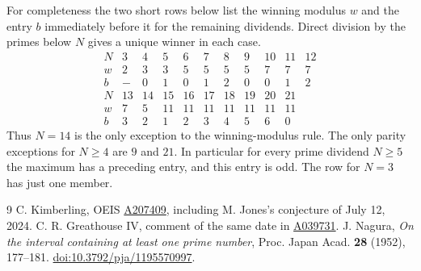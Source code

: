 \documentclass[11pt,letterpaper]{article}
\newcommand{\oeis}[1]{\href{https://oeis.org/A#1}{A#1}}
\begin{document}
For completeness the two short rows below list the winning modulus $w$ and the entry $b$ immediately before it for the remaining dividends. Direct division by the primes below $N$ gives a unique winner in each case.
\[
\begin{array}{c|rrrrrrrrrr}
 N&3&4&5&6&7&8&9&10&11&12\\\hline
 w&2&3&3&5&5&5&5&7&7&7\\
 b&-&0&1&0&1&2&0&0&1&2\\[3pt]\hline
 N&13&14&15&16&17&18&19&20&21\\\hline
 w&7&5&11&11&11&11&11&11&11\\
 b&3&2&1&2&3&4&5&6&0
\end{array}
\]
Thus $N=14$ is the only exception to the winning-modulus rule. The only parity exceptions for $N\ge4$ are $9$ and $21$. In particular for every prime dividend $N\ge5$ the maximum has a preceding entry, and this entry is odd. The row for $N=3$ has just one member.

\begin{thebibliography}{9}
 C. Kimberling, OEIS \oeis{207409}, including M. Jones's conjecture of July 12, 2024. C. R. Greathouse IV, comment of the same date in \oeis{039731}.
 J. Nagura, \emph{On the interval containing at least one prime number}, Proc. Japan Acad. \textbf{28} (1952), 177--181. \href{https://doi.org/10.3792/pja/1195570997}{doi:10.3792/pja/1195570997}.
\end{thebibliography}
\end{document}
